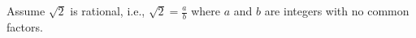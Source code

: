 \documentclass[preview]{standalone}
\begin{document}
\begin{center}
Assume $\sqrt{2}$ is rational, i.e., $\sqrt{2} = \frac{a}{b}$ where $a$ and $b$ are integers with no common factors.
\end{center}
\end{document}
